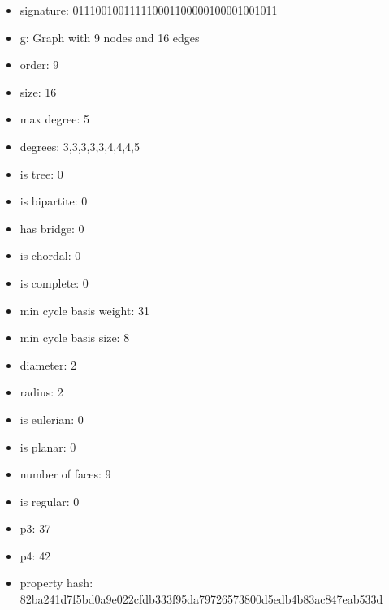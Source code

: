 \newpage
\begin{figure}
\end{figure}
\begin{itemize}
\item signature: 011100100111110001100000100001001011
\item g: Graph with 9 nodes and 16 edges
\item order: 9
\item size: 16
\item max degree: 5
\item degrees: 3,3,3,3,3,4,4,4,5
\item is tree: 0
\item is bipartite: 0
\item has bridge: 0
\item is chordal: 0
\item is complete: 0
\item min cycle basis weight: 31
\item min cycle basis size: 8
\item diameter: 2
\item radius: 2
\item is eulerian: 0
\item is planar: 0
\item number of faces: 9
\item is regular: 0
\item p3: 37
\item p4: 42
\item property hash: 82ba241d7f5bd0a9e022cfdb333f95da79726573800d5edb4b83ac847eab533d
\end{itemize}
